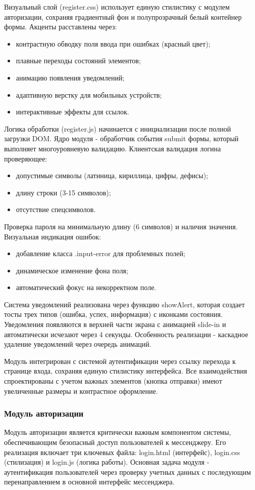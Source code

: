 Визуальный слой (register.css) использует единую стилистику с модулем авторизации, сохраняя градиентный фон и полупрозрачный белый контейнер формы. Акценты расставлены через:
\begin{itemize}
	\item контрастную обводку поля ввода при ошибках (красный цвет);
	\item плавные переходы состояний элементов;
	\item анимацию появления уведомлений;
	\item адаптивную верстку для мобильных устройств;
	\item интерактивные эффекты для ссылок.
\end{itemize}
Логика обработки (register.js) начинается с инициализации после полной загрузки DOM. Ядро модуля - обработчик события submit формы, который выполняет многоуровневую валидацию. Клиентская валидация логина проверяющее:
\begin{itemize}
	\item допустимые символы (латиница, кириллица, цифры, дефисы);
	\item длину строки (3-15 символов);
	\item отсутствие спецсимволов.
\end{itemize}
Проверка пароля на минимальную длину (6 символов) и наличия значения. Визуальная индикация ошибок:
\begin{itemize}
	\item добавление класса .input-error для проблемных полей;
	\item динамическое изменение фона поля;
	\item автоматический фокус на некорректном поле.
\end{itemize}

Система уведомлений реализована через функцию showAlert, которая создает тосты трех типов (ошибка, успех, информация) с иконками состояния. Уведомления появляются в верхней части экрана с анимацией slide-in и автоматически исчезают через 4 секунды. Особенность реализации - каскадное удаление уведомлений через очередь анимаций.

Модуль интегрирован с системой аутентификации через ссылку перехода к странице входа, сохраняя единую стилистику интерфейса. Все взаимодействия спроектированы с учетом важных элементов (кнопка отправки) имеют увеличенные размеры и контрастное оформление.
\subsubsection{Модуль авторизации}
Модуль авторизации является критически важным компонентом системы, обеспечивающим безопасный доступ пользователей к мессенджеру. Его реализация включает три ключевых файла: login.html (интерфейс), login.css (стилизация) и login.js (логика работы). Основная задача модуля - аутентификация пользователей через проверку учетных данных с последующим перенаправлением в основной интерфейс мессенджера.

